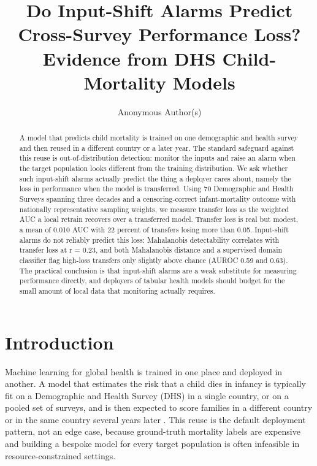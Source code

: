 \documentclass[letterpaper]{article} %
\title{Do Input-Shift Alarms Predict Cross-Survey Performance Loss? Evidence from DHS Child-Mortality Models}
\author{
    Anonymous Author(s)
}
\begin{document}
\maketitle

\begin{abstract}
A model that predicts child mortality is trained on one demographic and health survey and then reused in a different country or a later year. The standard safeguard against this reuse is out-of-distribution detection: monitor the inputs and raise an alarm when the target population looks different from the training distribution. We ask whether such input-shift alarms actually predict the thing a deployer cares about, namely the loss in performance when the model is transferred. Using 70 Demographic and Health Surveys spanning three decades and a censoring-correct infant-mortality outcome with nationally representative sampling weights, we measure transfer loss as the weighted AUC a local retrain recovers over a transferred model. Transfer loss is real but modest, a mean of 0.010 AUC with 22 percent of transfers losing more than 0.05. Input-shift alarms do not reliably predict this loss: Mahalanobis detectability correlates with transfer loss at r = 0.23, and both Mahalanobis distance and a supervised domain classifier flag high-loss transfers only slightly above chance (AUROC 0.59 and 0.63). The practical conclusion is that input-shift alarms are a weak substitute for measuring performance directly, and deployers of tabular health models should budget for the small amount of local data that monitoring actually requires.
\end{abstract}

\section{Introduction}

Machine learning for global health is trained in one place and deployed in another. A model that estimates the risk that a child dies in infancy is typically fit on a Demographic and Health Survey (DHS) in a single country, or on a pooled set of surveys, and is then expected to score families in a different country or in the same country several years later \citep{rutstein2006guide, croft2018guide}. This reuse is the default deployment pattern, not an edge case, because ground-truth mortality labels are expensive and building a bespoke model for every target population is often infeasible in resource-constrained settings.
\end{document}
